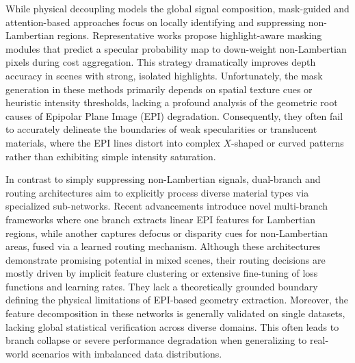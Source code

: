\documentclass[lettersize,journal]{IEEEtran}
\begin{document}
While physical decoupling models the global signal composition, mask-guided and attention-based approaches focus on locally identifying and suppressing non-Lambertian regions. Representative works \cite{highlight_mask,specular_attention,non_Lambertian_depth} propose highlight-aware masking modules that predict a specular probability map to down-weight non-Lambertian pixels during cost aggregation. This strategy dramatically improves depth accuracy in scenes with strong, isolated highlights. Unfortunately, the mask generation in these methods primarily depends on spatial texture cues or heuristic intensity thresholds, lacking a profound analysis of the geometric root causes of Epipolar Plane Image (EPI) degradation. Consequently, they often fail to accurately delineate the boundaries of weak specularities or translucent materials, where the EPI lines distort into complex $X$-shaped or curved patterns rather than exhibiting simple intensity saturation.

In contrast to simply suppressing non-Lambertian signals, dual-branch and routing architectures aim to explicitly process diverse material types via specialized sub-networks. Recent advancements \cite{dual_branch_network,routing_mechanism,mixture_of_experts_light_field} introduce novel multi-branch frameworks where one branch extracts linear EPI features for Lambertian regions, while another captures defocus or disparity cues for non-Lambertian areas, fused via a learned routing mechanism. Although these architectures demonstrate promising potential in mixed scenes, their routing decisions are mostly driven by implicit feature clustering or extensive fine-tuning of loss functions and learning rates. They lack a theoretically grounded boundary defining the physical limitations of EPI-based geometry extraction. Moreover, the feature decomposition in these networks is generally validated on single datasets, lacking global statistical verification across diverse domains. This often leads to branch collapse or severe performance degradation when generalizing to real-world scenarios with imbalanced data distributions.
\end{document}
